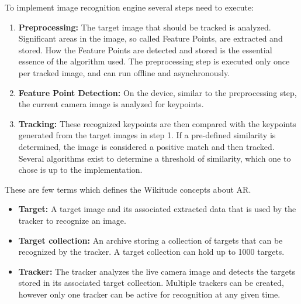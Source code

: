 \documentclass{article}
\begin{document}
\par To implement image recognition engine several steps need to execute: 
\begin{enumerate}
\item \textbf{Preprocessing:} The target image that should be tracked is analyzed. Significant areas in the image, so called Feature Points, are extracted and stored. How the Feature Points are detected and stored is the essential essence of the algorithm used. The preprocessing step is executed only once per tracked image, and can run offline and asynchronously.

\item \textbf{Feature Point Detection:}  On the device, similar to the preprocessing step, the current camera image is analyzed for keypoints. 

\item \textbf{Tracking: } These recognized keypoints are then compared with the keypoints generated from the target images in step 1. If a pre-defined similarity is determined, the image is considered a positive match and then tracked. Several algorithms exist to determine a threshold of similarity, which one to chose is up to the implementation. 
\end{enumerate}
\par These are few terms which defines the Wikitude concepts about AR. 

\begin{itemize}
\item \textbf{Target:}  A target image and its associated extracted data that is used by the tracker to recognize an image. 
\item \textbf{Target collection:}  An archive storing a collection of targets that can be recognized by the tracker. A target collection can hold up to 1000 targets.
\item \textbf{Tracker: }  The tracker analyzes the live camera image and detects the targets stored in its associated target collection. Multiple trackers can be created, however only one tracker can be active for recognition at any given time. 
\end{itemize}
\end{document}
